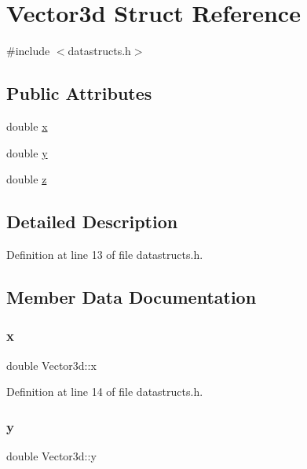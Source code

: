 \hypertarget{struct_vector3d}{}\section{Vector3d Struct Reference}
\label{struct_vector3d}


{\ttfamily \#include $<$datastructs.\+h$>$}

\subsection*{Public Attributes}
\begin{DoxyCompactItemize}
\item 
double \mbox{\hyperlink{struct_vector3d_afafd0a4e0eebb0baa1e35f9d8c98634a}{x}}
\item 
double \mbox{\hyperlink{struct_vector3d_a53c889dcd72f16bc0f21c15bb4e8a7ef}{y}}
\item 
double \mbox{\hyperlink{struct_vector3d_acda14a15e061a330d4ada509c9357c30}{z}}
\end{DoxyCompactItemize}


\subsection{Detailed Description}


Definition at line 13 of file datastructs.\+h.



\subsection{Member Data Documentation}
\mbox{\label{struct_vector3d_afafd0a4e0eebb0baa1e35f9d8c98634a}} 
\subsubsection{\texorpdfstring{x}{x}}
{\footnotesize\ttfamily double Vector3d\+::x}



Definition at line 14 of file datastructs.\+h.

\mbox{\label{struct_vector3d_a53c889dcd72f16bc0f21c15bb4e8a7ef}} 
\subsubsection{\texorpdfstring{y}{y}}
{\footnotesize\ttfamily double Vector3d\+::y}



